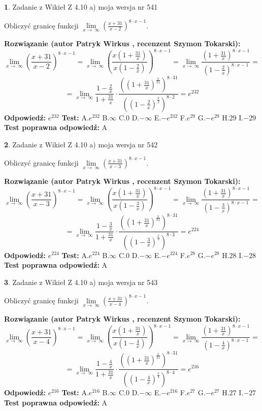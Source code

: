 \documentclass[12pt, a4paper]{article}
\theoremstyle{definition} %
\newtheorem{zad}{}
\newcommand{\zadStart}[1]{\begin{zad}#1\newline}
\newcommand{\zadStop}{\end{zad}}
\newcommand{\rozwStart}[2]{\noindent \textbf{Rozwiązanie (autor #1 , recenzent #2): }\newline}
\newcommand{\rozwStop}{\newline}
\newcommand{\odpStart}{\noindent \textbf{Odpowiedź:}\newline}
\newcommand{\odpStop}{\newline}
\newcommand{\testStart}{\noindent \textbf{Test:}\newline}
\newcommand{\testStop}{\newline}
\newcommand{\kluczStart}{\noindent \textbf{Test poprawna odpowiedź:}\newline}
\newcommand{\kluczStop}{\newline}
\begin{document}
\zadStart{Zadanie z Wikieł Z 4.10 a) moja wersja nr 541}

Obliczyć granicę funkcji  $\lim\limits_{x\to\ \infty}(\frac{x+31}{x-2})^{8\cdot x-1}$.
\zadStop
\rozwStart{Patryk Wirkus}{Szymon Tokarski}
$$\lim\limits_{x\to\ \infty}(\frac{x+31}{x-2})^{8\cdot x-1} = \lim\limits_{x\to\ \infty}(\frac{x(1+\frac{31}{x})}{x(1-\frac{2}{x})})^{8\cdot x-1}=\lim\limits_{x\to\ \infty}\frac{(1+\frac{31}{x})^{8\cdot x-1}}{(1-\frac{2}{x})^{8\cdot x-1}}=$$
$$=\lim\limits_{x\to\ \infty}\frac{1-\frac{2}{x}}{1+\frac{31}{x}}\cdot\frac{((1+\frac{31}{x})^{\frac{x}{31}})^{8\cdot31}}{((1-\frac{2}{x})^{\frac{x}{2}})^{8\cdot2}}=e^{232}$$
\rozwStop
\odpStart
$e^{232}$
\odpStop
\testStart
A.$e^{232}$ B.$\infty$ C.$0$ D.$-\infty$ E.$-e^{232}$
F.$e^{29}$ G.$-e^{29}$
H.$29$
I.$-29$
\testStop
\kluczStart
A
\kluczStop



\zadStart{Zadanie z Wikieł Z 4.10 a) moja wersja nr 542}

Obliczyć granicę funkcji  $\lim\limits_{x\to\ \infty}(\frac{x+31}{x-3})^{8\cdot x-1}$.
\zadStop
\rozwStart{Patryk Wirkus}{Szymon Tokarski}
$$\lim\limits_{x\to\ \infty}(\frac{x+31}{x-3})^{8\cdot x-1} = \lim\limits_{x\to\ \infty}(\frac{x(1+\frac{31}{x})}{x(1-\frac{3}{x})})^{8\cdot x-1}=\lim\limits_{x\to\ \infty}\frac{(1+\frac{31}{x})^{8\cdot x-1}}{(1-\frac{3}{x})^{8\cdot x-1}}=$$
$$=\lim\limits_{x\to\ \infty}\frac{1-\frac{3}{x}}{1+\frac{31}{x}}\cdot\frac{((1+\frac{31}{x})^{\frac{x}{31}})^{8\cdot31}}{((1-\frac{3}{x})^{\frac{x}{3}})^{8\cdot3}}=e^{224}$$
\rozwStop
\odpStart
$e^{224}$
\odpStop
\testStart
A.$e^{224}$ B.$\infty$ C.$0$ D.$-\infty$ E.$-e^{224}$
F.$e^{28}$ G.$-e^{28}$
H.$28$
I.$-28$
\testStop
\kluczStart
A
\kluczStop



\zadStart{Zadanie z Wikieł Z 4.10 a) moja wersja nr 543}

Obliczyć granicę funkcji  $\lim\limits_{x\to\ \infty}(\frac{x+31}{x-4})^{8\cdot x-1}$.
\zadStop
\rozwStart{Patryk Wirkus}{Szymon Tokarski}
$$\lim\limits_{x\to\ \infty}(\frac{x+31}{x-4})^{8\cdot x-1} = \lim\limits_{x\to\ \infty}(\frac{x(1+\frac{31}{x})}{x(1-\frac{4}{x})})^{8\cdot x-1}=\lim\limits_{x\to\ \infty}\frac{(1+\frac{31}{x})^{8\cdot x-1}}{(1-\frac{4}{x})^{8\cdot x-1}}=$$
$$=\lim\limits_{x\to\ \infty}\frac{1-\frac{4}{x}}{1+\frac{31}{x}}\cdot\frac{((1+\frac{31}{x})^{\frac{x}{31}})^{8\cdot31}}{((1-\frac{4}{x})^{\frac{x}{4}})^{8\cdot4}}=e^{216}$$
\rozwStop
\odpStart
$e^{216}$
\odpStop
\testStart
A.$e^{216}$ B.$\infty$ C.$0$ D.$-\infty$ E.$-e^{216}$
F.$e^{27}$ G.$-e^{27}$
H.$27$
I.$-27$
\testStop
\kluczStart
A
\kluczStop
\end{document}
